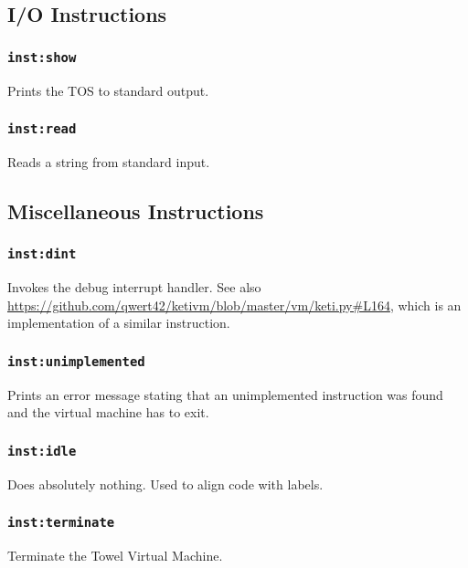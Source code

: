 \documentclass{article}
\newcommand{\inst}[1] {\texttt{inst:#1}}
\begin{document}
\subsection{I/O Instructions}

\subsubsection{\inst{show}}

Prints the TOS to standard output.

\subsubsection{\inst{read}}

Reads a string from standard input.

\subsection{Miscellaneous Instructions}

\subsubsection{\inst{dint}}

Invokes the debug interrupt handler. See also \url{https://github.com/qwert42/ketivm/blob/master/vm/keti.py#L164}, which is an implementation of a similar instruction.

\subsubsection{\inst{unimplemented}}

Prints an error message stating that an unimplemented instruction was found and the virtual machine has to exit.

\subsubsection{\inst{idle}}

Does absolutely nothing. Used to align code with labels.

\subsubsection{\inst{terminate}}

Terminate the Towel Virtual Machine.
\end{document}
